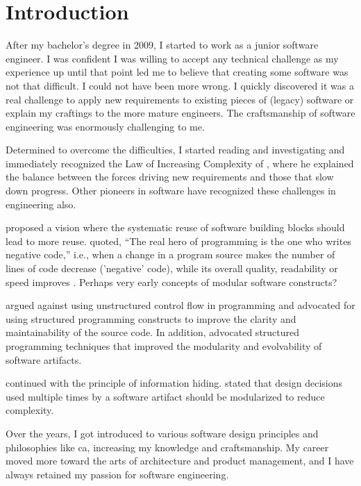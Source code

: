 \chapter{Introduction} \label{chap_introduction}

After my bachelor's degree in 2009, I started to work as a junior software engineer. I was
confident I was willing to accept any technical challenge as my experience up until that
point led me to believe that creating some software was not that difficult. I could not
have been more wrong. I quickly discovered it was a real challenge to apply new
requirements to existing pieces of (legacy) software or explain my craftings to the more
mature engineers. The craftsmanship of software engineering was enormously challenging to
me.

Determined to overcome the difficulties, I started reading and investigating and
immediately recognized the Law of Increasing Complexity of
\textcite{lehman_programs_1980}, where he explained the balance between the forces driving
new requirements and those that slow down progress. Other pioneers in software have
recognized these challenges in engineering also.

\textcite{d_mcilroy_nato_1968} proposed a vision where the systematic reuse of software
building blocks should lead to more reuse. \textcite{d_mcilroy_nato_1968} quoted,
\enquote{The real hero of programming is the one who writes negative code,} i.e., when a
change in a program source makes the number of lines of code decrease ('negative' code),
while its overall quality, readability or speed improves
\parencite{wikipedia_douglas_2023}. Perhaps very early concepts of modular software
constructs?

\textcite{dijkstra_letters_1968} argued against using unstructured control flow in
programming and advocated for using structured programming constructs to improve the
clarity and maintainability of the source code. In addition,
 advocated structured programming techniques that
improved the modularity and evolvability of software artifacts.

\textcite{parnas_criteria_1972} continued with the principle of information hiding.
 stated that design decisions used multiple times by a
software artifact should be modularized to reduce complexity. 

Over the years, I got introduced to various software design principles and philosophies
like \gls{ca}, increasing my knowledge and craftsmanship. My career moved more toward the
arts of architecture and product management, and I have always retained my passion for
software engineering.

